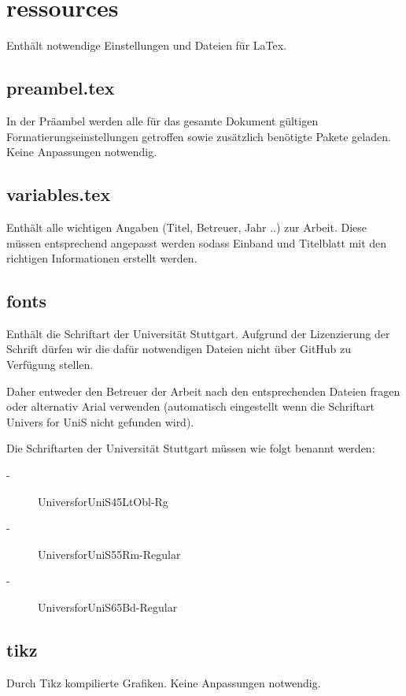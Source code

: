 \section*{ressources}

Enthält notwendige Einstellungen und Dateien für LaTex.

\subsection*{preambel.tex}

In der Präambel werden alle für das gesamte Dokument gültigen Formatierungseinstellungen getroffen sowie zusätzlich benötigte Pakete geladen. Keine Anpassungen notwendig.

\subsection*{variables.tex}
\label{section:_E_ressources_variables}

Enthält alle wichtigen Angaben (Titel, Betreuer, Jahr ..) zur Arbeit. Diese müssen entsprechend angepasst werden sodass Einband und Titelblatt mit den richtigen Informationen erstellt werden.

\subsection*{fonts}
Enthält die Schriftart der Universität Stuttgart. Aufgrund der Lizenzierung der Schrift dürfen wir die dafür notwendigen Dateien nicht über GitHub zu Verfügung stellen. 

Daher entweder den Betreuer der Arbeit nach den entsprechenden Dateien fragen oder alternativ Arial verwenden (automatisch eingestellt wenn die Schriftart Univers for UniS nicht gefunden wird).

Die Schriftarten der Universität Stuttgart müssen wie folgt benannt werden:

\begin{description}
	\item[-] UniversforUniS45LtObl-Rg
	\item[-] UniversforUniS55Rm-Regular
	\item[-] UniversforUniS65Bd-Regular
\end{description}

\subsection*{tikz}
Durch Tikz kompilierte Grafiken. Keine Anpassungen notwendig.
